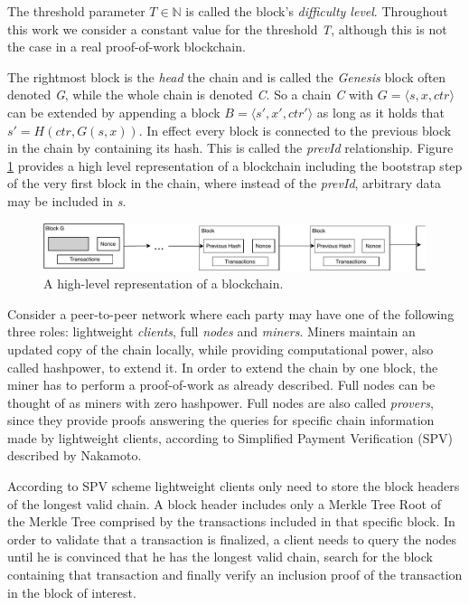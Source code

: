 The threshold parameter $T \in \mathbb{N}$ is called the block's \textit{difficulty level}.
Throughout this work we consider a constant value for the threshold \textit{T}, although this is not
the case in a real proof-of-work blockchain.

The rightmost block is the \textit{head} the chain and is called the \textit{Genesis} block often
denoted \textit{G}, while the whole chain is denoted \textit{C}. So a chain \textit{C} with
$G = \langle s, x, ctr \rangle$ can be extended by appending a block $B = \langle s', x', ctr'
\rangle$ as long as it holds that $s' = H(ctr, G(s,x))$. In effect every block is connected to the
previous block in the chain by containing its hash. This is called the \textit{prevId} relationship.
Figure \ref{fig:abstract_chain} provides a high level representation of a blockchain including the
bootstrap step of the very first block in the chain, where instead of the \textit{prevId},
arbitrary data may be included in \textit{s}.

\begin{figure}[h!]
	\begin{center}
		\includegraphics[scale=0.7]{figures/abstract_chain.pdf}
	\end{center}
	\caption{A high-level representation of a blockchain.}
	\label{fig:abstract_chain}
\end{figure}


Consider a peer-to-peer network where each party may have one of the following three roles:
lightweight \textit{clients}, full \textit{nodes} and \textit{miners}.
Miners maintain an updated copy of the chain locally, while providing computational power, also
called hashpower, to extend it. In order to extend the chain by one block, the miner has to perform
a proof-of-work as already described.
Full nodes can be thought of as miners with zero hashpower. Full nodes are also called
\textit{provers}, since they provide proofs  answering the queries for specific chain information
made by lightweight clients, according to Simplified Payment Verification (SPV) described by
Nakamoto\cite{nakamoto}.

According to SPV scheme lightweight clients only need to store the block headers of the longest
valid chain. A block header includes only a Merkle Tree Root of the Merkle Tree comprised by
the transactions included in that specific block. In order to validate that a transaction is
finalized, a client needs to query the nodes until he is convinced that he has the longest
valid chain, search for the block containing that transaction and finally verify an inclusion
proof of the transaction in the block of interest.

